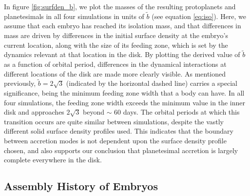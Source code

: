 \documentclass[twocolumn]{aastex63}
\begin{document}

In figure \ref{fig:surfden_b}, we plot the masses of the resulting protoplanets and planetesimals in all four simulations in units of $\tilde{b}$ (see equation \ref{eq:iso}). Here, we assume that each embryo has reached its isolation mass, and that differences in mass are driven by differences in the initial surface density at the embryo's current location, along with the size of its feeding zone, which is set by the dynamics relevant at that location in the disk. By plotting the derived value of $\tilde{b}$ as a function of orbital period, differences in the dynamical interactions at different locations of the disk are made more clearly visible. As mentioned previously, $\tilde{b} = 2 \sqrt{3}$ (indicated by the horizontal dashed line) carries a special significance, being the minimum feeding zone width that a body can have. In all four simulations, the feeding zone width exceeds the minimum value in the inner disk and approaches $2 \sqrt{3}$ beyond $\sim$ 60 days. The orbital periods at which this transition occurs are quite similar between simulations, despite the vastly different solid surface density profiles used. This indicates that the boundary between accretion modes is not dependent upon the surface density profile chosen, and also supports our conclusion that planetesimal accretion is largely complete everywhere in the disk.


\subsection{Assembly History of Embryos}\label{sec:assembly}
\end{document}
